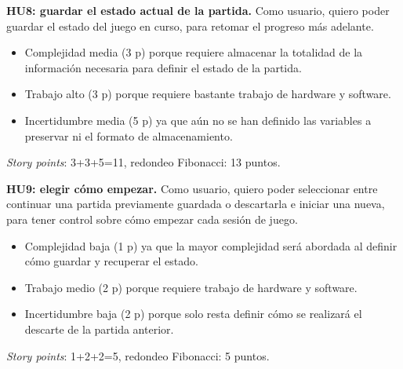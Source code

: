 \documentclass[
11pt, %
]{charter}
\begin{document}

	\textbf{HU8: guardar el estado actual de la partida.} Como usuario, quiero poder guardar el estado del juego en curso, para retomar el progreso más adelante.

	\begin{itemize}
		\item Complejidad media (3 p) porque requiere almacenar la totalidad de la información necesaria para definir el estado de la partida.
		\item Trabajo alto (3 p) porque requiere bastante trabajo de hardware y software. 
		\item Incertidumbre media (5 p) ya que aún no se han definido las variables a preservar ni el formato de almacenamiento. 
	\end{itemize}
	\textit{Story points}: 3+3+5=11, redondeo Fibonacci: 13 puntos.
		
	\textbf{HU9: elegir cómo empezar.} Como usuario, quiero poder seleccionar entre continuar una partida previamente guardada o descartarla e iniciar una nueva, para tener control sobre cómo empezar cada sesión de juego.

	\begin{itemize}
		\item Complejidad baja (1 p) ya que la mayor complejidad será abordada al definir cómo guardar y recuperar el estado.
		\item Trabajo medio (2 p) porque requiere trabajo de hardware y software. 
		\item Incertidumbre baja (2 p) porque solo resta definir cómo se realizará el descarte de la partida anterior. 
	\end{itemize}
	\textit{Story points}: 1+2+2=5, redondeo Fibonacci: 5 puntos.
\end{document}
